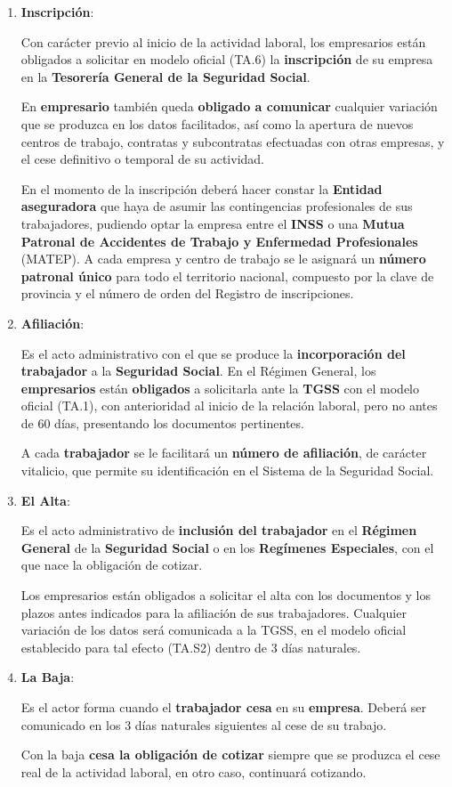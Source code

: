 \begin{enumerate}
    \item \textbf{Inscripción}:

    Con carácter previo al inicio de la actividad laboral, los empresarios están obligados a solicitar en modelo oficial (TA.6) la \textbf{inscripción} de su empresa en la \textbf{Tesorería General de la Seguridad Social}.

    En \textbf{empresario} también queda \textbf{obligado a comunicar} cualquier variación que se produzca en los datos facilitados, así como la apertura de nuevos centros de trabajo, contratas y subcontratas efectuadas con otras empresas, y el cese definitivo o temporal de su actividad.

    En el momento de la inscripción deberá hacer constar  la \textbf{Entidad aseguradora} que haya de asumir las contingencias profesionales de sus trabajadores, pudiendo optar la empresa entre el \textbf{INSS} o una \textbf{Mutua Patronal de Accidentes de Trabajo y Enfermedad Profesionales} (MATEP). A cada empresa y centro de trabajo se le asignará un \textbf{número patronal único} para todo el territorio nacional, compuesto por la clave de provincia y el número de orden del Registro de inscripciones.

    \item \textbf{Afiliación}:

    Es el acto administrativo con el que se produce la \textbf{incorporación del trabajador} a la \textbf{Seguridad Social}. En el Régimen General, los \textbf{empresarios} están \textbf{obligados} a solicitarla ante la \textbf{TGSS} con el modelo oficial (TA.1), con anterioridad al inicio de la relación laboral, pero no antes de 60 días, presentando los documentos pertinentes.

    A cada \textbf{trabajador} se le facilitará un \textbf{número de afiliación}, de carácter vitalicio, que permite su identificación en el Sistema de la Seguridad Social.

    \item \textbf{El Alta}:

    Es el acto administrativo de \textbf{inclusión del trabajador} en el \textbf{Régimen General} de la \textbf{Seguridad Social} o en los \textbf{Regímenes Especiales}, con el que nace la obligación de cotizar.

    Los empresarios están obligados a solicitar el alta con los documentos y los plazos antes indicados para la afiliación de sus trabajadores. Cualquier variación de los datos será comunicada a la TGSS, en el modelo oficial establecido para tal efecto (TA.S2) dentro de 3 días naturales.

    \item \textbf{La Baja}:

    Es el actor forma cuando el \textbf{trabajador cesa} en su \textbf{empresa}. Deberá ser comunicado en los 3 días naturales siguientes al cese de su trabajo.

    Con la baja \textbf{cesa la obligación de cotizar} siempre que se produzca el cese real de la actividad laboral, en otro caso, continuará cotizando.
\end{enumerate}

